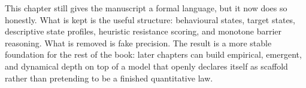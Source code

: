 \begin{summarybox}
This chapter still gives the manuscript a formal language, but it now does so
honestly. What is kept is the useful structure: behavioural states, target
states, descriptive state profiles, heuristic resistance scoring, and monotone
barrier reasoning. What is removed is fake precision. The result is a more
stable foundation for the rest of the book: later chapters can build empirical,
emergent, and dynamical depth on top of a model that openly declares itself as
scaffold rather than pretending to be a finished quantitative law.
\end{summarybox}
